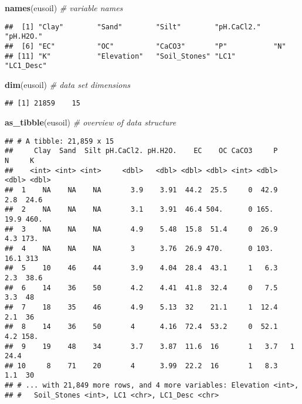 \documentclass[
]{article}
\newenvironment{Shaded}{\begin{snugshade}}{\end{snugshade}}
\newcommand{\CommentTok}[1]{\textcolor[rgb]{0.56,0.35,0.01}{\textit{#1}}}
\newcommand{\KeywordTok}[1]{\textcolor[rgb]{0.13,0.29,0.53}{\textbf{#1}}}
\newcommand{\NormalTok}[1]{#1}
\begin{document}
\begin{Shaded}
\begin{Highlighting}[]
\KeywordTok{names}\NormalTok{(eusoil) }\CommentTok{\# variable names}
\end{Highlighting}
\end{Shaded}

\begin{verbatim}
##  [1] "Clay"        "Sand"        "Silt"        "pH.CaCl2."   "pH.H2O."    
##  [6] "EC"          "OC"          "CaCO3"       "P"           "N"          
## [11] "K"           "Elevation"   "Soil_Stones" "LC1"         "LC1_Desc"
\end{verbatim}

\begin{Shaded}
\begin{Highlighting}[]
\KeywordTok{dim}\NormalTok{(eusoil) }\CommentTok{\# data set dimensions}
\end{Highlighting}
\end{Shaded}

\begin{verbatim}
## [1] 21859    15
\end{verbatim}

\newpage

\begin{Shaded}
\begin{Highlighting}[]
\KeywordTok{as\_tibble}\NormalTok{(eusoil) }\CommentTok{\# overview of data structure}
\end{Highlighting}
\end{Shaded}

\begin{verbatim}
## # A tibble: 21,859 x 15
##     Clay  Sand  Silt pH.CaCl2. pH.H2O.    EC    OC CaCO3     P     N     K
##    <int> <int> <int>     <dbl>   <dbl> <dbl> <dbl> <int> <dbl> <dbl> <dbl>
##  1    NA    NA    NA       3.9    3.91  44.2  25.5     0  42.9   2.8  24.6
##  2    NA    NA    NA       3.1    3.91  46.4 504.      0 165.   19.9 460. 
##  3    NA    NA    NA       4.9    5.48  15.8  51.4     0  26.9   4.3 173. 
##  4    NA    NA    NA       3      3.76  26.9 470.      0 103.   16.1 313  
##  5    10    46    44       3.9    4.04  28.4  43.1     1   6.3   2.3  38.6
##  6    14    36    50       4.2    4.41  41.8  32.4     0   7.5   3.3  48  
##  7    18    35    46       4.9    5.13  32    21.1     1  12.4   2.1  36  
##  8    14    36    50       4      4.16  72.4  53.2     0  52.1   4.2 158. 
##  9    19    48    34       3.7    3.87  11.6  16       1   3.7   1    24.4
## 10     8    71    20       4      3.99  22.2  16       1   8.3   1.1  30  
## # ... with 21,849 more rows, and 4 more variables: Elevation <int>,
## #   Soil_Stones <int>, LC1 <chr>, LC1_Desc <chr>
\end{verbatim}
\end{document}
